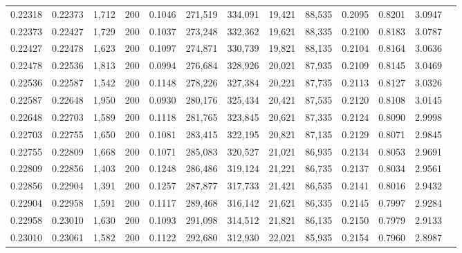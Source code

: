 \begin{tabular}{rrrrrrrrrrrrr}
0.22318 & 0.22373 & 1,712 & 200 &                                     0.1046 & 271,519 & 334,091 &  19,421 &  88,535 & 0.2095 & 0.8201 & 3.0947 \\
0.22373 & 0.22427 & 1,729 & 200 &                                     0.1037 & 273,248 & 332,362 &  19,621 &  88,335 & 0.2100 & 0.8183 & 3.0787 \\
0.22427 & 0.22478 & 1,623 & 200 &                                     0.1097 & 274,871 & 330,739 &  19,821 &  88,135 & 0.2104 & 0.8164 & 3.0636 \\
0.22478 & 0.22536 & 1,813 & 200 &                                     0.0994 & 276,684 & 328,926 &  20,021 &  87,935 & 0.2109 & 0.8145 & 3.0469 \\
0.22536 & 0.22587 & 1,542 & 200 &                                     0.1148 & 278,226 & 327,384 &  20,221 &  87,735 & 0.2113 & 0.8127 & 3.0326 \\
0.22587 & 0.22648 & 1,950 & 200 &                                     0.0930 & 280,176 & 325,434 &  20,421 &  87,535 & 0.2120 & 0.8108 & 3.0145 \\
0.22648 & 0.22703 & 1,589 & 200 &                                     0.1118 & 281,765 & 323,845 &  20,621 &  87,335 & 0.2124 & 0.8090 & 2.9998 \\
0.22703 & 0.22755 & 1,650 & 200 &                                     0.1081 & 283,415 & 322,195 &  20,821 &  87,135 & 0.2129 & 0.8071 & 2.9845 \\
0.22755 & 0.22809 & 1,668 & 200 &                                     0.1071 & 285,083 & 320,527 &  21,021 &  86,935 & 0.2134 & 0.8053 & 2.9691 \\
0.22809 & 0.22856 & 1,403 & 200 &                                     0.1248 & 286,486 & 319,124 &  21,221 &  86,735 & 0.2137 & 0.8034 & 2.9561 \\
0.22856 & 0.22904 & 1,391 & 200 &                                     0.1257 & 287,877 & 317,733 &  21,421 &  86,535 & 0.2141 & 0.8016 & 2.9432 \\
0.22904 & 0.22958 & 1,591 & 200 &                                     0.1117 & 289,468 & 316,142 &  21,621 &  86,335 & 0.2145 & 0.7997 & 2.9284 \\
0.22958 & 0.23010 & 1,630 & 200 &                                     0.1093 & 291,098 & 314,512 &  21,821 &  86,135 & 0.2150 & 0.7979 & 2.9133 \\
0.23010 & 0.23061 & 1,582 & 200 &                                     0.1122 & 292,680 & 312,930 &  22,021 &  85,935 & 0.2154 & 0.7960 & 2.8987 \\

\end{tabular}

